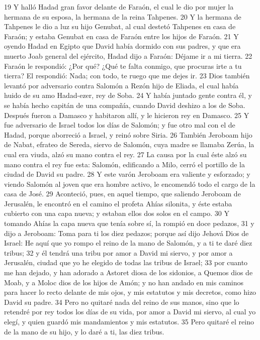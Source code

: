 19 Y halló Hadad gran favor delante de Faraón, el cual le dio por mujer la hermana de su esposa, la hermana de la reina Tahpenes.
20 Y la hermana de Tahpenes le dio a luz su hijo Genubat, al cual destetó Tahpenes en casa de Faraón; y estaba Genubat en casa de Faraón entre los hijos de Faraón.
21 Y oyendo Hadad en Egipto que David había dormido con sus padres, y que era muerto Joab general del ejército, Hadad dijo a Faraón: Déjame ir a mi tierra.
22 Faraón le respondió: ¿Por qué? ¿Qué te falta conmigo, que procuras irte a tu tierra? El respondió: Nada; con todo, te ruego que me dejes ir.
23 Dios también levantó por adversario contra Salomón a Rezón hijo de Eliada, el cual había huido de su amo Hadad-ezer, rey de Soba.
24 Y había juntado gente contra él, y se había hecho capitán de una compañía, cuando David deshizo a los de Soba. Después fueron a Damasco y habitaron allí, y le hicieron rey en Damasco.
25 Y fue adversario de Israel todos los días de Salomón; y fue otro mal con el de Hadad, porque aborreció a Israel, y reinó sobre Siria.
26 También Jeroboam hijo de Nabat, efrateo de Sereda, siervo de Salomón, cuya madre se llamaba Zerúa, la cual era viuda, alzó su mano contra el rey.
27 La causa por la cual éste alzó su mano contra el rey fue esta: Salomón, edificando a Milo, cerró el portillo de la ciudad de David su padre.
28 Y este varón Jeroboam era valiente y esforzado; y viendo Salomón al joven que era hombre activo, le encomendó todo el cargo de la casa de José.
29 Aconteció, pues, en aquel tiempo, que saliendo Jeroboam de Jerusalén, le encontró en el camino el profeta Ahías silonita, y éste estaba cubierto con una capa nueva; y estaban ellos dos solos en el campo.
30 Y tomando Ahías la capa nueva que tenía sobre sí, la rompió en doce pedazos,
31 y dijo a Jeroboam: Toma para ti los diez pedazos; porque así dijo Jehová Dios de Israel: He aquí que yo rompo el reino de la mano de Salomón, y a ti te daré diez tribus;
32 y él tendrá una tribu por amor a David mi siervo, y por amor a Jerusalén, ciudad que yo he elegido de todas las tribus de Israel;
33 por cuanto me han dejado, y han adorado a Astoret diosa de los sidonios, a Quemos dios de Moab, y a Moloc dios de los hijos de Amón; y no han andado en mis caminos para hacer lo recto delante de mis ojos, y mis estatutos y mis decretos, como hizo David su padre.
34 Pero no quitaré nada del reino de sus manos, sino que lo retendré por rey todos los días de su vida, por amor a David mi siervo, al cual yo elegí, y quien guardó mis mandamientos y mis estatutos.
35 Pero quitaré el reino de la mano de su hijo, y lo daré a ti, las diez tribus.
